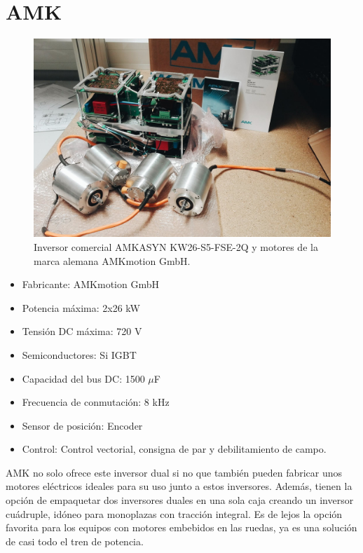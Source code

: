 \section{AMK}
\begin{figure}[H]
	\centering
	\includegraphics[width=0.7\linewidth]{fig/amk}
	\caption{Inversor comercial AMKASYN KW26-S5-FSE-2Q y motores de la marca alemana AMKmotion GmbH.}
	\label{fig:amk}
\end{figure}

\begin{itemize}
	\item Fabricante: AMKmotion GmbH
	\item Potencia máxima: 2x26 kW
	\item Tensión DC máxima: 720 V
	\item Semiconductores: Si IGBT
	\item Capacidad del bus DC: 1500 $\mu$F
	\item Frecuencia de conmutación: 8 kHz
	\item Sensor de posición: Encoder
	\item Control: Control vectorial, consigna de par y debilitamiento de campo.
\end{itemize}

AMK no solo ofrece este inversor dual si no que también pueden fabricar unos motores eléctricos ideales para su uso junto a estos inversores. Además, tienen la opción de empaquetar dos inversores duales en una sola caja creando un inversor cuádruple, idóneo para monoplazas con tracción integral. Es de lejos la opción favorita para los equipos con motores embebidos en las ruedas, ya es una solución de casi todo el tren de potencia.

